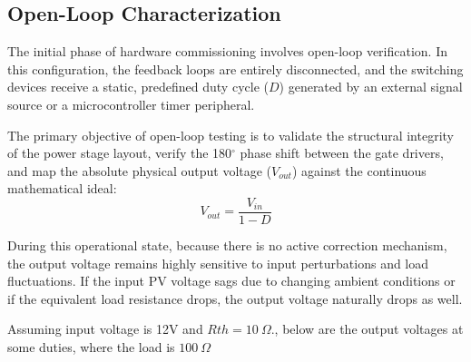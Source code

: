 \subsection{Open-Loop Characterization}
The initial phase of hardware commissioning involves open-loop verification. In this configuration, the feedback loops are entirely disconnected, and the switching devices receive a static, predefined duty cycle ($D$) generated by an external signal source or a microcontroller timer peripheral. 

The primary objective of open-loop testing is to validate the structural integrity of the power stage layout, verify the 180$^\circ$ phase shift between the gate drivers, and map the absolute physical output voltage ($V_{out}$) against the continuous mathematical ideal:
\begin{equation}
    V_{out} = \frac{V_{in}}{1 - D}
\end{equation}

During this operational state, because there is no active correction mechanism, the output voltage remains highly sensitive to input perturbations and load fluctuations. If the input PV voltage sags due to changing ambient conditions or if the equivalent load resistance drops, the output voltage naturally drops as well.

Assuming input voltage is 12V and $Rth = 10\ \Omega$., below are the output voltages at some duties, where the load is $100\ \Omega$

